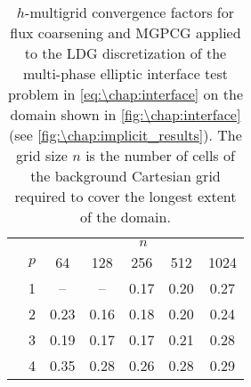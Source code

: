 \begin{table}[htb]
\caption{$h$-multigrid convergence factors for flux coarsening and MGPCG applied to the LDG discretization of the multi-phase elliptic interface test problem in \cref{eq:\chap:interface} on the domain shown in \cref{fig:\chap:interface} (see \cref{fig:\chap:implicit_results}). The grid size $n$ is the number of cells of the background Cartesian grid required to cover the longest extent of the domain.\vspace{-1.8em}}
\label{tab:elliptic_interface}
\centering
\small
\begin{tabular}{@{}cl@{\qquad}ccccc@{}}
&&&&&& \\ \midrule
&& \multicolumn{5}{c}{$n$} \\
& $p$ & 64 & 128 & 256 & 512 & 1024 \\ \cmidrule{1-7}
& 1 &  --  &  --  & 0.17 & 0.20 & 0.27 \\ 
& 2 & 0.23 & 0.16 & 0.18 & 0.20 & 0.24 \\ 
& 3 & 0.19 & 0.17 & 0.17 & 0.21 & 0.28 \\ 
& 4 & 0.35 & 0.28 & 0.26 & 0.28 & 0.29 \\ \midrule
\end{tabular}
\end{table}
